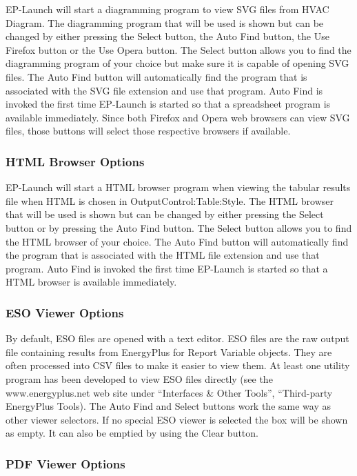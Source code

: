 EP-Launch will start a diagramming program to view SVG files from HVAC Diagram. The diagramming program that will be used is shown but can be changed by either pressing the Select button, the Auto Find button, the Use Firefox button or the Use Opera button. The Select button allows you to find the diagramming program of your choice but make sure it is capable of opening SVG files. The Auto Find button will automatically find the program that is associated with the SVG file extension and use that program. Auto Find is invoked the first time EP-Launch is started so that a spreadsheet program is available immediately. Since both Firefox and Opera web browsers can view SVG files, those buttons will select those respective browsers if available.

\subsubsection{HTML Browser Options}\label{html-browser-options}

EP-Launch will start a HTML browser program when viewing the tabular results file when HTML is chosen in OutputControl:Table:Style. The HTML browser that will be used is shown but can be changed by either pressing the Select button or by pressing the Auto Find button. The Select button allows you to find the HTML browser of your choice. The Auto Find button will automatically find the program that is associated with the HTML file extension and use that program. Auto Find is invoked the first time EP-Launch is started so that a HTML browser is available immediately.

\subsubsection{ESO Viewer Options}\label{eso-viewer-options}

By default, ESO files are opened with a text editor. ESO files are the raw output file containing results from EnergyPlus for Report Variable objects. They are often processed into CSV files to make it easier to view them. At least one utility program has been developed to view ESO files directly (see the www.energyplus.net web site under ``Interfaces \& Other Tools'', ``Third-party EnergyPlus Tools). The Auto Find and Select buttons work the same way as other viewer selectors. If no special ESO viewer is selected the box will be shown as empty. It can also be emptied by using the Clear button.

\subsubsection{PDF Viewer Options}\label{pdf-viewer-options}


